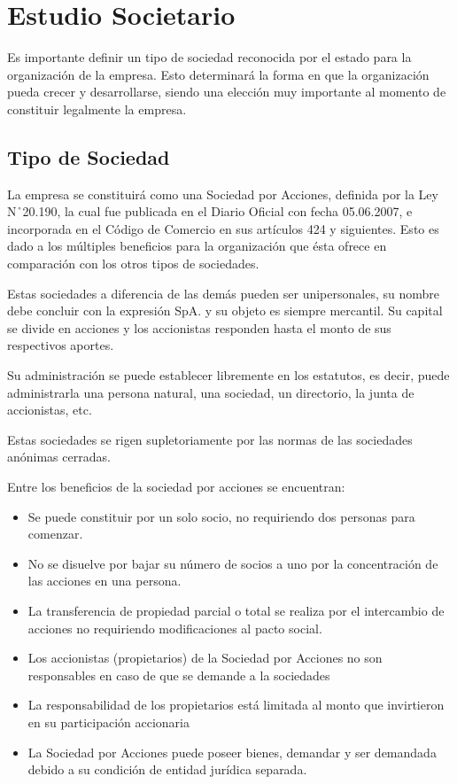 \section{Estudio Societario}
Es importante definir un tipo de sociedad reconocida por el estado para la
organización de la empresa. Esto determinará la forma en que la organización
pueda crecer y desarrollarse, siendo una elección muy importante al momento de
constituir legalmente la empresa.

\subsection{Tipo de Sociedad}
La empresa se constituirá como una Sociedad por Acciones, definida por la Ley
N\r{\ }20.190, la cual fue publicada en el Diario Oficial con
fecha 05.06.2007, e incorporada en el Código de Comercio en sus artículos 424 y
siguientes. Esto es dado a los múltiples beneficios para la organización que
ésta ofrece en comparación con los otros tipos de sociedades.

Estas sociedades a diferencia de las demás pueden ser unipersonales, su nombre
debe concluir con la expresión SpA. y su objeto es siempre mercantil. Su
capital se divide en acciones y los accionistas responden hasta el monto de sus
respectivos aportes.

Su administración se puede establecer libremente en los estatutos, es decir,
puede administrarla una persona natural, una sociedad, un directorio, la junta
de accionistas, etc.

Estas sociedades se rigen supletoriamente por las normas de las sociedades
anónimas cerradas.

Entre los beneficios de la sociedad por acciones se encuentran:

\begin{itemize}
\item Se puede constituir por un solo socio, no requiriendo dos personas para comenzar.
\item No se disuelve por bajar su número de socios a uno por la concentración de las acciones en una persona.
\item La transferencia de propiedad parcial o total se realiza por el intercambio de acciones no requiriendo modificaciones al pacto social.
\item Los accionistas (propietarios) de la Sociedad por Acciones no son responsables en caso de que se demande a la sociedades
\item La responsabilidad de los propietarios está limitada al monto que invirtieron en su participación accionaria
\item La Sociedad por Acciones puede poseer bienes, demandar y ser demandada debido a su condición de entidad jurídica separada.
\end{itemize}

